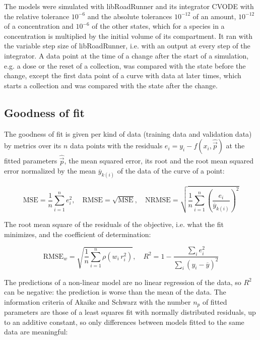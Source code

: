 \documentclass{article}
\begin{document}
The models were simulated with libRoadRunner \cite{Welsh2023} and its integrator CVODE \cite{Hindmarsh2005} with the relative tolerance $10^{-6}$ and the absolute tolerances $10^{-12}$ of an amount, $10^{-12}$ of a concentration and $10^{-6}$ of the other states, which for a species in a concentration is multiplied by the initial volume of its compartment. It ran with the variable step size of libRoadRunner, i.e. with an output at every step of the integrator. A data point at the time of a change after the start of a simulation, e.g. a dose or the reset of a collection, was compared with the state before the change, except the first data point of a curve with data at later times, which starts a collection and was compared with the state after the change.

\subsection{Goodness of fit}

The goodness of fit is given per kind of data (training data and validation data) by metrics over its $n$ data points with the residuals $e_i = y_i - f(x_i, \hat{\vec{p}})$ at the fitted parameters $\hat{\vec{p}}$, the mean squared error, its root and the root mean squared error normalized by the mean $\overline{y}_{k(i)}$ of the data of the curve of a point:

\begin{equation}
\mathrm{MSE} = \frac{1}{n} \sum_{i=1}^{n} e_i^2, \quad \mathrm{RMSE} = \sqrt{\mathrm{MSE}}, \quad \mathrm{NRMSE} = \sqrt{\frac{1}{n} \sum_{i=1}^{n} \left(\frac{e_i}{\overline{y}_{k(i)}}\right)^2}
\end{equation}

The root mean square of the residuals of the objective, i.e. what the fit minimizes, and the coefficient of determination:

\begin{equation}
\mathrm{RMSE}_w = \sqrt{\frac{1}{n} \sum_{i=1}^{n} \rho\left(w_i\, r_i^2\right)}, \quad R^2 = 1 - \frac{\sum_{i} e_i^2}{\sum_{i} \left(y_i - \overline{y}\right)^2}
\end{equation}

The predictions of a non-linear model are no linear regression of the data, so $R^2$ can be negative: the prediction is worse than the mean of the data. The information criteria of Akaike \cite{Akaike1974} and Schwarz \cite{Schwarz1978} with the number $n_p$ of fitted parameters are those of a least squares fit with normally distributed residuals, up to an additive constant, so only differences between models fitted to the same data are meaningful:
\end{document}
